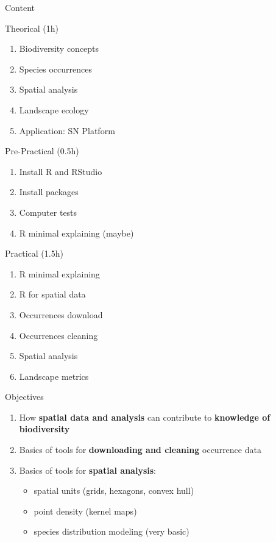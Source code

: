 \documentclass[
  ignorenonframetext,
]{beamer}
\providecommand{\tightlist}{%
  \setlength{\itemsep}{0pt}\setlength{\parskip}{0pt}}\usepackage{longtable,booktabs,array}
\begin{document}
\begin{frame}{Content}
\label{content}
\end{frame}

\begin{frame}{Theorical (1h)}
\begin{enumerate}
\tightlist
\item
  Biodiversity concepts
\item
  Species occurrences
\item
  Spatial analysis
\item
  Landscape ecology
\item
  Application: SN Platform
\end{enumerate}
\end{frame}

\begin{frame}{Pre-Practical (0.5h)}
\begin{enumerate}
\tightlist
\item
  Install R and RStudio
\item
  Install packages
\item
  Computer tests
\item
  R minimal explaining (maybe)
\end{enumerate}
\end{frame}

\begin{frame}{Practical (1.5h)}
\begin{enumerate}
\tightlist
\item
  R minimal explaining
\item
  R for spatial data
\item
  Occurrences download
\item
  Occurrences cleaning
\item
  Spatial analysis
\item
  Landscape metrics
\end{enumerate}
\end{frame}

\begin{frame}{Objectives}
\label{objectives}
\begin{enumerate}[<+->]
\tightlist
\item
  How \textbf{spatial data and analysis} can contribute to
  \textbf{knowledge of biodiversity}
\item
  Basics of tools for \textbf{downloading and cleaning} occurrence data
\item
  Basics of tools for \textbf{spatial analysis}:

  \begin{itemize}[<+->]
  \tightlist
  \item
    spatial units (grids, hexagons, convex hull)
  \item
    point density (kernel maps)
  \item
    species distribution modeling (very basic)
  \end{itemize}
\end{enumerate}
\end{frame}
\end{document}
